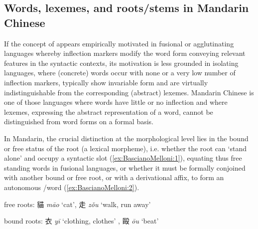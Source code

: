 \documentclass[output=paper]{langsci/langscibook}
\begin{document}
\subsection{Words, lexemes, and roots/stems in Mandarin Chinese}

If the concept of  appears empirically motivated in fusional or
agglutinating languages whereby inflection markers modify the word form
conveying relevant features in the syntactic contexts, its motivation is
less grounded in isolating languages, where (concrete) words occur with
none or a very low number of inflection markers, typically show
invariable form and are virtually indistinguishable from the
corresponding (abstract) lexemes. Mandarin Chinese is one of those
languages where words have little or no inflection and where lexemes,
expressing the abstract representation of a word, cannot be
distinguished from word forms on a formal basis.

In Mandarin, the crucial distinction at the morphological level lies in
the bound or free status of the root (a lexical morpheme), i.e. whether
the root can `stand alone' and occupy a syntactic slot (\ref{ex:BascianoMelloni:1}), equating
thus free standing words in fusional languages, or whether it must be
formally conjoined with another bound or free root, or with a
derivational affix, to form an autonomous /word (\ref{ex:BascianoMelloni:2}).

\ea\label{ex:BascianoMelloni:1} free roots: 貓 \emph{māo} `cat', 走 \emph{zǒu} `walk, run away'


\ex\label{ex:BascianoMelloni:2} bound roots: 衣  \emph{yī}  `clothing, clothes' , 毆 \emph{ōu}  `beat'


\z
\end{document}
